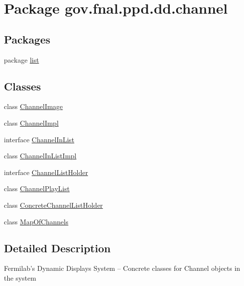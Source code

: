 \hypertarget{namespacegov_1_1fnal_1_1ppd_1_1dd_1_1channel}{\section{Package gov.\-fnal.\-ppd.\-dd.\-channel}
\label{namespacegov_1_1fnal_1_1ppd_1_1dd_1_1channel}
}
\subsection*{Packages}
\begin{DoxyCompactItemize}
\item 
package \hyperlink{namespacegov_1_1fnal_1_1ppd_1_1dd_1_1channel_1_1list}{list}
\end{DoxyCompactItemize}
\subsection*{Classes}
\begin{DoxyCompactItemize}
\item 
class \hyperlink{classgov_1_1fnal_1_1ppd_1_1dd_1_1channel_1_1ChannelImage}{Channel\-Image}
\item 
class \hyperlink{classgov_1_1fnal_1_1ppd_1_1dd_1_1channel_1_1ChannelImpl}{Channel\-Impl}
\item 
interface \hyperlink{interfacegov_1_1fnal_1_1ppd_1_1dd_1_1channel_1_1ChannelInList}{Channel\-In\-List}
\item 
class \hyperlink{classgov_1_1fnal_1_1ppd_1_1dd_1_1channel_1_1ChannelInListImpl}{Channel\-In\-List\-Impl}
\item 
interface \hyperlink{interfacegov_1_1fnal_1_1ppd_1_1dd_1_1channel_1_1ChannelListHolder}{Channel\-List\-Holder}
\item 
class \hyperlink{classgov_1_1fnal_1_1ppd_1_1dd_1_1channel_1_1ChannelPlayList}{Channel\-Play\-List}
\item 
class \hyperlink{classgov_1_1fnal_1_1ppd_1_1dd_1_1channel_1_1ConcreteChannelListHolder}{Concrete\-Channel\-List\-Holder}
\item 
class \hyperlink{classgov_1_1fnal_1_1ppd_1_1dd_1_1channel_1_1MapOfChannels}{Map\-Of\-Channels}
\end{DoxyCompactItemize}


\subsection{Detailed Description}
Fermilab's Dynamic Displays System -- Concrete classes for Channel objects in the system